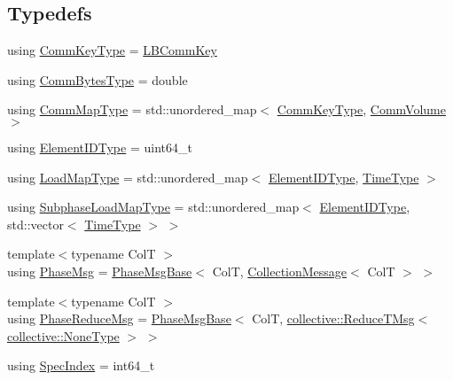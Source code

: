\subsection*{Typedefs}
\begin{DoxyCompactItemize}
\item 
using \hyperlink{namespacevt_1_1vrt_1_1collection_1_1balance_a01c9a1060d83d052604a3ff12918033a}{Comm\+Key\+Type} = \hyperlink{structvt_1_1vrt_1_1collection_1_1balance_1_1_l_b_comm_key}{L\+B\+Comm\+Key}
\item 
using \hyperlink{namespacevt_1_1vrt_1_1collection_1_1balance_a0772d7dd137393e9874b9f8caa96d420}{Comm\+Bytes\+Type} = double
\item 
using \hyperlink{namespacevt_1_1vrt_1_1collection_1_1balance_a10860c956804d644db54a16012352728}{Comm\+Map\+Type} = std\+::unordered\+\_\+map$<$ \hyperlink{namespacevt_1_1vrt_1_1collection_1_1balance_a01c9a1060d83d052604a3ff12918033a}{Comm\+Key\+Type}, \hyperlink{structvt_1_1vrt_1_1collection_1_1balance_1_1_comm_volume}{Comm\+Volume} $>$
\item 
using \hyperlink{namespacevt_1_1vrt_1_1collection_1_1balance_a14c8d2c972f2913aa3f1636e5be0a120}{Element\+I\+D\+Type} = uint64\+\_\+t
\item 
using \hyperlink{namespacevt_1_1vrt_1_1collection_1_1balance_a45306ee4bf38fe3fb586d1ee2fa3d147}{Load\+Map\+Type} = std\+::unordered\+\_\+map$<$ \hyperlink{namespacevt_1_1vrt_1_1collection_1_1balance_a14c8d2c972f2913aa3f1636e5be0a120}{Element\+I\+D\+Type}, \hyperlink{namespacevt_a876a9d0cd5a952859c72de8a46881442}{Time\+Type} $>$
\item 
using \hyperlink{namespacevt_1_1vrt_1_1collection_1_1balance_a3d91523158c1025b7b665240072f3b7e}{Subphase\+Load\+Map\+Type} = std\+::unordered\+\_\+map$<$ \hyperlink{namespacevt_1_1vrt_1_1collection_1_1balance_a14c8d2c972f2913aa3f1636e5be0a120}{Element\+I\+D\+Type}, std\+::vector$<$ \hyperlink{namespacevt_a876a9d0cd5a952859c72de8a46881442}{Time\+Type} $>$ $>$
\item 
{\footnotesize template$<$typename ColT $>$ }\\using \hyperlink{namespacevt_1_1vrt_1_1collection_1_1balance_a7120dc064f6e8c4157a5f4c81b825393}{Phase\+Msg} = \hyperlink{structvt_1_1vrt_1_1collection_1_1balance_1_1_phase_msg_base}{Phase\+Msg\+Base}$<$ ColT, \hyperlink{structvt_1_1vrt_1_1collection_1_1_collection_message}{Collection\+Message}$<$ ColT $>$ $>$
\item 
{\footnotesize template$<$typename ColT $>$ }\\using \hyperlink{namespacevt_1_1vrt_1_1collection_1_1balance_a04cf83e524629461fafc8d349af8ac8a}{Phase\+Reduce\+Msg} = \hyperlink{structvt_1_1vrt_1_1collection_1_1balance_1_1_phase_msg_base}{Phase\+Msg\+Base}$<$ ColT, \hyperlink{namespacevt_1_1collective_a28b82d5d48c9bc6e4fd738fcbf9e0f62}{collective\+::\+Reduce\+T\+Msg}$<$ \hyperlink{namespacevt_1_1collective_af988b64711231f96d33ebfaf891e52a4}{collective\+::\+None\+Type} $>$ $>$
\item 
using \hyperlink{namespacevt_1_1vrt_1_1collection_1_1balance_a72a5e0d9936ddf57f8e6c64e0e9fd123}{Spec\+Index} = int64\+\_\+t
\end{DoxyCompactItemize}
